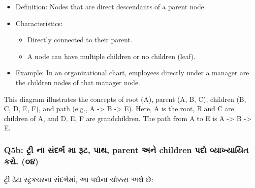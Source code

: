 \begin{enumerate}
  \begin{itemize}
  \tightlist
  \item
    Definition: Nodes that are direct descendants of a parent node.
  \item
    Characteristics:

    \begin{itemize}
    \tightlist
    \item
      Directly connected to their parent.
    \item
      A node can have multiple children or no children (leaf).
    \end{itemize}
  \item
    Example: In an organizational chart, employees directly under a
    manager are the children nodes of that manager node.
  \end{itemize}
\end{enumerate}

\begin{Shaded}
\begin{Highlighting}[]
\end{Highlighting}
\end{Shaded}

This diagram illustrates the concepts of root (A), parent (A, B, C),
children (B, C, D, E, F), and path (e.g., A -\textgreater{} B
-\textgreater{} E). Here, A is the root, B and C are children of A, and
D, E, F are grandchildren. The path from A to E is A -\textgreater{} B
-\textgreater{} E.

\hypertarget{q5b-uxa9fuxab0-uxaa8-uxab8uxaa6uxab0uxaad-uxaae-uxab0uxa9f-uxaaauxaa5-parent-uxa85uxaa8-children-uxaaauxaa6-uxab5uxaafuxa96uxaafuxaafuxaa4-uxa95uxab0.-uxae6uxaea}{%
\subsubsection{Q5b: ટ્રી ના સંદર્ભ મા રૂટ, પાથ, parent અને children પદો
વ્યાખ્યાયિત કરો.
(૦૪)}\label{q5b-uxa9fuxab0-uxaa8-uxab8uxaa6uxab0uxaad-uxaae-uxab0uxa9f-uxaaauxaa5-parent-uxa85uxaa8-children-uxaaauxaa6-uxab5uxaafuxa96uxaafuxaafuxaa4-uxa95uxab0.-uxae6uxaea}}

ટ્રી ડેટા સ્ટ્રક્ચરના સંદર્ભમાં, આ પદોના ચોક્કસ અર્થ છે:

